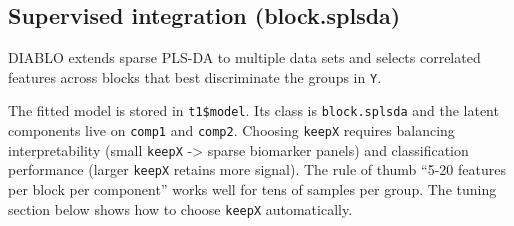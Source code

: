 \documentclass[
]{book}
\newenvironment{Shaded}{\begin{snugshade}}{\end{snugshade}}
\newcommand{\AttributeTok}[1]{\textcolor[rgb]{0.13,0.29,0.53}{#1}}
\newcommand{\CommentTok}[1]{\textcolor[rgb]{0.56,0.35,0.01}{\textit{#1}}}
\newcommand{\DecValTok}[1]{\textcolor[rgb]{0.00,0.00,0.81}{#1}}
\newcommand{\FloatTok}[1]{\textcolor[rgb]{0.00,0.00,0.81}{#1}}
\newcommand{\FunctionTok}[1]{\textcolor[rgb]{0.13,0.29,0.53}{\textbf{#1}}}
\newcommand{\NormalTok}[1]{#1}
\newcommand{\OtherTok}[1]{\textcolor[rgb]{0.56,0.35,0.01}{#1}}
\newcommand{\SpecialCharTok}[1]{\textcolor[rgb]{0.81,0.36,0.00}{\textbf{#1}}}
\newcommand{\StringTok}[1]{\textcolor[rgb]{0.31,0.60,0.02}{#1}}
\begin{document}
\begin{Shaded}
\end{Shaded}

\subsection{Supervised integration (block.splsda)}\label{supervised-integration-block.splsda}

DIABLO \citep{Singh_DIABLO_2019} extends sparse PLS-DA to multiple data sets and selects correlated features across blocks that best discriminate the groups in \texttt{Y}.

\begin{Shaded}
\end{Shaded}

The fitted model is stored in \texttt{t1\$model}.
Its class is \texttt{block.splsda} and the latent components live on \texttt{comp1} and \texttt{comp2}.
Choosing \texttt{keepX} requires balancing interpretability (small \texttt{keepX} -\textgreater{} sparse biomarker panels) and classification performance (larger \texttt{keepX} retains more signal).
The rule of thumb ``5-20 features per block per component'' works well for tens of samples per group.
The tuning section below shows how to choose \texttt{keepX} automatically.
\end{document}
